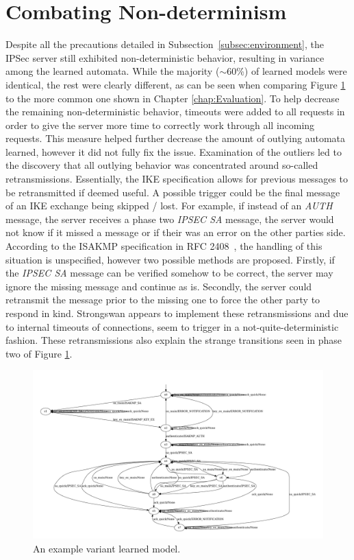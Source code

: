 \section{Combating Non-determinism} \label{subsec:nondet}
Despite all the precautions detailed in Subsection~\ref{subsec:environment}, the IPSec server still exhibited non-deterministic behavior, resulting in variance among the learned automata. While the majority ($\sim$60\%) of learned models were identical, the rest were clearly different, as can be seen when comparing Figure \ref{fig:nofilterb} to the more common one shown in Chapter \ref{chap:Evaluation}. To help decrease the remaining non-deterministic behavior, timeouts were added to all requests in order to give the server more time to correctly work through all incoming requests. This measure helped further decrease the amount of outlying automata learned, however it did not fully fix the issue. Examination of the outliers led to the discovery that all outlying behavior was concentrated around so-called retransmissions. Essentially, the IKE specification allows for previous messages to be retransmitted if deemed useful. A possible trigger could be the final message of an IKE exchange being skipped / lost. For example, if instead of an \emph{AUTH} message, the server receives a phase two \emph{IPSEC SA} message, the server would not know if it missed a message or if their was an error on the other parties side. According to the ISAKMP specification in RFC 2408~\parencite{rfc2408}, the handling of this situation is unspecified, however two possible methods are proposed. Firstly, if the \emph{IPSEC SA} message can be verified somehow to be correct, the server may ignore the missing message and continue as is. Secondly, the server could retransmit the message prior to the missing one to force the other party to respond in kind. Strongswan appears to implement these retransmissions and due to internal timeouts of connections, seem to trigger in a not-quite-deterministic fashion. These retransmissions also explain the strange transitions seen in phase two of Figure \ref{fig:nofilterb}. 

\begin{figure}[h]
	\centering
	\includegraphics[width=0.7\linewidth]{images/NoFilterB}
	\caption{An example variant learned model.}
	\label{fig:nofilterb}
\end{figure}

